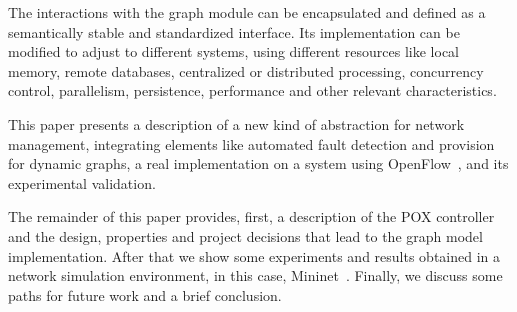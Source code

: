 The interactions with the graph module can be encapsulated and 
defined as a semantically stable and standardized interface. Its implementation
can be modified to adjust to different systems, using different resources like
local memory, remote databases, centralized or distributed processing,
concurrency control, 
parallelism, persistence, performance and other relevant characteristics.

%


This paper presents a
description of a new kind of abstraction for network management,
integrating elements like automated fault detection and provision for dynamic
graphs,
a real implementation on a system using OpenFlow~\citep{nick2008openflow},
and its experimental validation.

The remainder of this paper provides, first, a description of the POX controller
and the design, properties and project decisions that lead to the graph model
implementation.
After that we show some experiments and results obtained in a network simulation
environment, in this case, Mininet~\citep{lantz2010network}.
Finally, we discuss some paths for future work and a brief conclusion. 
